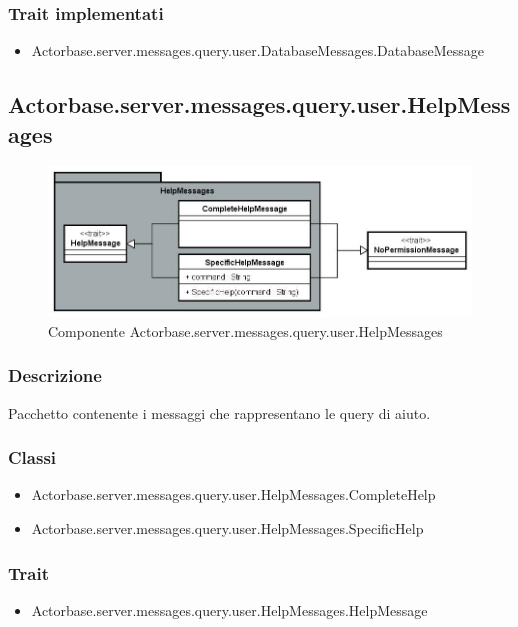 \documentclass[a4paper]{article}
\begin{document}
			\subsubsection{Trait implementati}
				\begin{itemize}
					\item Actorbase.server.messages.query.user.DatabaseMessages.DatabaseMessage
				\end{itemize}
				
		\subsection{Actorbase.server.messages.query.user.HelpMessages}
		
			\begin{figure}[H]
				\centering
				\includegraphics[width=\textwidth]{ST/Server/helpMessagesLevel.jpg}
				\caption{Componente Actorbase.server.messages.query.user.HelpMessages}
			\end{figure}
			
			\subsubsection{Descrizione}
				Pacchetto contenente i messaggi che rappresentano le query di aiuto.				
				
			\subsubsection{Classi}
				\begin{itemize}
					\item Actorbase.server.messages.query.user.HelpMessages.CompleteHelp
					\item Actorbase.server.messages.query.user.HelpMessages.SpecificHelp
				\end{itemize}
				
			\subsubsection{Trait}
				\begin{itemize}
					\item Actorbase.server.messages.query.user.HelpMessages.HelpMessage
				\end{itemize}
		
\end{document}

